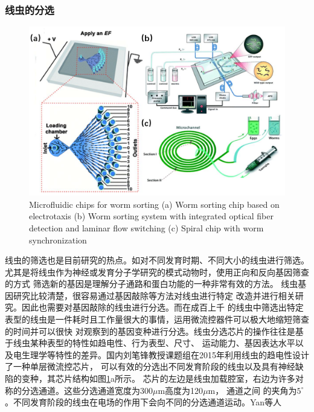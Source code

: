 \subsubsection{线虫的分选}
\label{sec:intro:analog}
	\begin{figure}[t]
	  \centering
	  \includegraphics[width=12cm]{figure/chap1/sorting.jpg}
		{Microfluidic chips for worm sorting
		(a) Worm sorting chip based on electrotaxis\cite{wang2015highly}
		(b) Worm sorting system with integrated optical fiber detection 
			and laminar flow switching\cite{yan2014continuous}
		(c) Spiral chip with worm synchronization\cite{sofela2018high}
		}
	  \label{fig:sorting}
	\end{figure}
	线虫的筛选也是目前研究的热点。如对不同发育时期、不同大小的线虫进行筛选。
	尤其是将线虫作为神经或发育分子学研究的模式动物时，使用正向和反向基因筛查的方式
	筛选新的基因是理解分子通路和蛋白功能的一种非常有效的方法。
	线虫基因研究比较清楚，很容易通过基因敲除等方法对线虫进行特定
	改造并进行相关研究。因此也需要对基因敲除的线虫进行分选。而在成百上千
	的线虫中筛选出特定表型的线虫是一件耗时且工作量很大的事情，运用微流控器件可以极大地缩短筛查的时间并可以很快
	对观察到的基因变种进行分选。线虫分选芯片的操作往往是基于线虫某种表型的特性如趋电性、行为表型、尺寸、
	运动能力、基因表达水平以及电生理学等特性的差异。国内刘笔锋教授课题组在2015年利用线虫的趋电性设计了一种单层微流控芯片\cite{wang2015highly}，
	可以有效的分选出不同发育阶段的线虫以及具有神经缺陷的变种，其芯片结构如图\ref{fig:sorting}a所示。
	芯片的左边是线虫加载腔室，右边为许多对称的分选通道。这些分选通道宽度为300$\mu$m高度为120$\mu$m，
	通道之间
	的夹角为$5^\circ$。不同发育阶段的线虫在电场的作用下会向不同的分选通道运动。Yan等人\cite{yan2014continuous}
